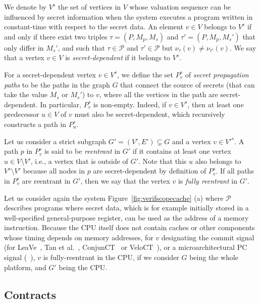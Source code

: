 We denote by $V^s$ the set of vertices in $V$ whose valuation sequence can be influenced by secret information when the system executes a program written in constant-time with respect to the secret data.
An element $v \in V$ belongs to $V^s$ if and only if there exist two triples $\tau = (P, M_p, M_s)$ and $\tau' = (P, M_p, M_s')$ that only differ in $M_s'$, and such that $\tau \in \mathcal{P}$ and $\tau' \in \mathcal{P}$ but $\nu_\tau(v) \neq \nu_{\tau'}(v)$.
We say that a vertex $v \in V$ is \emph{secret-dependent} if it belongs to $V^s$.

For a secret-dependent vertex $v \in V^s$, we define the set $P^s_v$ of \emph{secret propagation paths} to be the paths in the graph $G$ that connect the source of secrets (that can take the value $M_s$ or $M_s'$) to $v$, where all the vertices in the path are secret-dependent.
In particular, $P^s_v$ is non-empty.
Indeed, if $v \in V^s$, then at least one predecessor $u \in V$ of $v$ must also be secret-dependent, which recursively constructs a path in $P^s_u$.

Let us consider a strict subgraph $G' = (V', E') \subsetneq G$ and a vertex $v \in V'^s$.
A path $p$ in $P^s_v$ is said to be \emph{reentrant} in $G'$ if it contains at least one vertex $u \in V \setminus V'$, i.e., a vertex that is outside of $G'$.
Note that this $u$ also belongs to $V^s\setminus V'$ because all nodes in $p$ are secret-dependent by definition of $P^s_v$.
If all paths in $P^s_v$ are reentrant in $G'$, then we say that the vertex $v$ is \emph{fully reentrant} in $G'$.

Let us consider again the system Figure~\ref{fig:verifscopecache} (a) where $\mathcal{P}$ describes programs where secret data, which is for example initially stored in a well-specified general-purpose register, can be used as the address of a memory instruction.
Because the CPU itself does not contain caches or other components whose timing depends on memory addresses, for $v$ designating the commit signal (for LeaVe~\cite{wang2023specification}, Tan et al.~\cite{tan2025contractshadowlogic}, ConjunCT~\cite{dinesh2024conjunct} or VeloCT~\cite{dinesh2025h}), or a microarchitectural PC signal (\ucfi~\cite{ceesay2024mucfi}), $v$ is fully-reentrant in the CPU, if we consider $G$ being the whole platform, and $G'$ being the CPU.

\subsection{Contracts}

